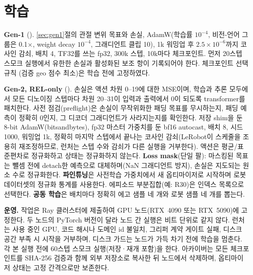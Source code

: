 \documentclass[conference,10pt]{IEEEtran}
\begin{document}
\section{학습}\label{sec:train}
\textbf{Gen-1} (). \ref{sec:gen1}절의 관절 변위 목표와 손실, AdamW(학습률 $10^{-4}$, 비전-언어 그룹은
0.1$\times$, weight decay $10^{-4}$, 그래디언트 클립 10), 1k 워밍업 후 $2.5\times10^{-6}$까지 코사인 감쇠, 배치 4, TF32를 쓰는 fp32,
300k 스텝, 10k마다 체크포인트. 먼저 20스텝 스모크 실행에서 유한한 손실과 활성화된 보조 항이 기록되어야 한다. 체크포인트 선택 규칙
(검증 geo 점수 최소)은 학습 전에 고정하였다.

\textbf{Gen-2, REL-only} (). 손실은 액션 차원 0--19에 대한 MSE이며, 학습과 추론 모두에서 모든 디노이징
스텝마다 차원 20--31이 입력과 출력에서 0이 되도록 transformer를 패치한다. 사전 점검(preflight)은 손실이 무작위화한 패딩 목표를
무시하는지, 패딩 예측이 정확히 0인지, 그 디코더 그래디언트가 사라지는지를 확인한다. 저장 shim을 둔 8-bit AdamW(bitsandbytes),
fp32 마스터 가중치를 둔 bf16 autocast, 배치 8, 시드 1000, 워밍업 1k, 정확히 마지막 스텝에서 끝나는 코사인 감쇠(LeRobot이 스케줄을
조용히 재조정하므로, 런처는 스텝 수와 감쇠가 다른 실행을 거부한다). 액션은 평균/표준편차로 정규화하고 상태는 정규화하지 않는다.
\textbf{Loss mask}(단일 팔): 마스킹된 목표는 뺄셈 전에 detach한 예측으로 대체하며(NaN 그래디언트 방지), 손실은 지도되는 원소 수로
정규화한다. \textbf{파인튜닝}은 사전학습 가중치에서 새 옵티마이저로 시작하며 로봇 데이터셋의 정규화 통계를 사용한다. 에피소드
부분집합(예: R30)은 인덱스 목록으로 선택한다. \textbf{공동 학습}은 배치마다 정확히 에고 샘플 네 개와 로봇 샘플 네 개를 뽑는다.

\textbf{운영.} 작업은 Ray 클러스터에 제출하여 GPU 노드(RTX~4090 또는 RTX~5090)에 고정한다. 두 노드의 PyTorch 버전이 달라 노드 간
실행은 비트 단위로 같지 않다. 런처는 사용 중인 GPU, 코드 해시나 도메인 id 불일치, 그리퍼 계약 게이트 실패, 디스크 공간 부족 시
시작을 거부하며, 디스크 가드는 노드가 가득 차기 전에 학습을 멈춘다. 각 본 실행 전에 60스텝 스모크 실행(저장·재개 포함)을 한다.
아카이버는 모든 체크포인트를 SHA-256 검증과 함께 외부 저장소로 복사한 뒤 노드에서 삭제하며, 옵티마이저 상태는 고정 간격으로만
보존한다.
\end{document}
